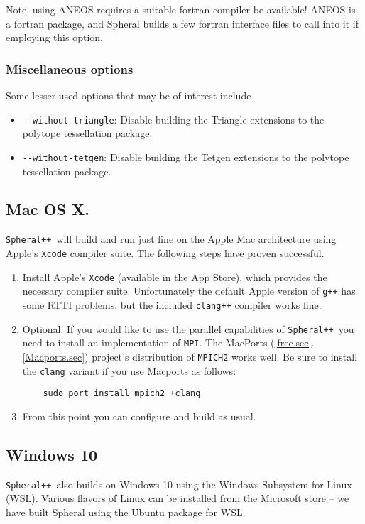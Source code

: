 \documentclass{article}
\newcommand{\Spheral}{{\tt Spheral++}}
\begin{document}
Note, using ANEOS requires a suitable fortran compiler be available!  ANEOS is a fortran package, and Spheral builds a few fortran interface files to call into it if employing this option.

\subsubsection{Miscellaneous options}
Some lesser used options that may be of interest include
\begin{itemize}
\item \verb+--without-triangle+: Disable building the Triangle extensions to the polytope tessellation package.
\item \verb+--without-tetgen+: Disable building the Tetgen extensions to the polytope tessellation package.
\end{itemize}

\subsection{Mac OS X.}
\Spheral\ will build and run just fine on the Apple Mac architecture using Apple's \verb+Xcode+ compiler suite.  The following steps have proven successful.
\begin{enumerate}
\item Install Apple's \verb+Xcode+ (available in the App Store), which provides the necessary compiler suite.  Unfortunately the default Apple version of \verb.g++. has some RTTI problems, but the included \verb.clang++. compiler works fine.
\item Optional.  If you would like to use the parallel capabilities of \Spheral\ you need to install an implementation of \verb.MPI..  The MacPorts (\ref{free.sec}.\ref{Macports.sec}) project's distribution of \verb.MPICH2. works well.  Be sure to install the \verb.clang. variant if you use Macports as follows:
\begin{verbatim}
    sudo port install mpich2 +clang
\end{verbatim}
\item From this point you can configure and build as usual.
\end{enumerate}

\subsection{Windows 10}
\Spheral\ also builds on Windows 10 using the Windows Subsystem for Linux (WSL).  Various flavors of Linux can be installed from the Microsoft store -- we have built Spheral using the Ubuntu package for WSL.
\end{document}
